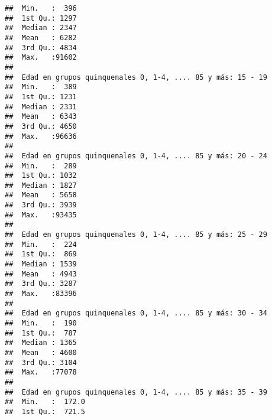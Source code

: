 \documentclass[11pt,]{article}
\begin{document}
\begin{verbatim}
##  Min.   :  396                                             
##  1st Qu.: 1297                                             
##  Median : 2347                                             
##  Mean   : 6282                                             
##  3rd Qu.: 4834                                             
##  Max.   :91602                                             
##                                                            
##  Edad en grupos quinquenales 0, 1-4, .... 85 y más: 15 - 19
##  Min.   :  389                                             
##  1st Qu.: 1231                                             
##  Median : 2331                                             
##  Mean   : 6343                                             
##  3rd Qu.: 4650                                             
##  Max.   :96636                                             
##                                                            
##  Edad en grupos quinquenales 0, 1-4, .... 85 y más: 20 - 24
##  Min.   :  289                                             
##  1st Qu.: 1032                                             
##  Median : 1827                                             
##  Mean   : 5658                                             
##  3rd Qu.: 3939                                             
##  Max.   :93435                                             
##                                                            
##  Edad en grupos quinquenales 0, 1-4, .... 85 y más: 25 - 29
##  Min.   :  224                                             
##  1st Qu.:  869                                             
##  Median : 1539                                             
##  Mean   : 4943                                             
##  3rd Qu.: 3287                                             
##  Max.   :83396                                             
##                                                            
##  Edad en grupos quinquenales 0, 1-4, .... 85 y más: 30 - 34
##  Min.   :  190                                             
##  1st Qu.:  787                                             
##  Median : 1365                                             
##  Mean   : 4600                                             
##  3rd Qu.: 3104                                             
##  Max.   :77078                                             
##                                                            
##  Edad en grupos quinquenales 0, 1-4, .... 85 y más: 35 - 39
##  Min.   :  172.0                                           
##  1st Qu.:  721.5                                           

\end{verbatim}
\end{document}
